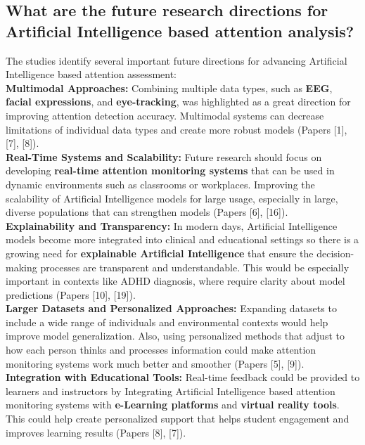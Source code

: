 \documentclass[12pt]{article}
\begin{document}
\subsection{ What are the future research directions for Artificial Intelligence based attention analysis?} 

The studies identify several important future directions for advancing Artificial Intelligence based attention assessment: \\

\textbullet \textbf{Multimodal Approaches:} Combining multiple data types, such as \textbf{EEG}, \textbf{facial expressions}, and \textbf{eye-tracking}, was highlighted as a great direction for improving attention detection accuracy. Multimodal systems can decrease limitations of individual data types and create more robust models (Papers [1], [7], [8]). \\ 

\textbullet \textbf{Real-Time Systems and Scalability:} Future research should focus on developing \textbf{real-time attention monitoring systems} that can be used in dynamic environments such as classrooms or workplaces. Improving the scalability of Artificial Intelligence models for large usage, especially in large, diverse populations that can strengthen models (Papers [6], [16]). \\ 

\textbullet \textbf{Explainability and Transparency:} In modern days, Artificial Intelligence models become more integrated into clinical and educational settings so there is a growing need for \textbf{explainable Artificial Intelligence} that ensure the decision-making processes are transparent and understandable. This would be especially important in contexts like ADHD diagnosis, where require clarity about model predictions (Papers [10], [19]). \\ 

\textbullet \textbf{Larger Datasets and Personalized Approaches:} Expanding datasets to include a wide range of individuals and environmental contexts would help improve model generalization. Also, using personalized methods that adjust to how each person thinks and processes information could make attention monitoring systems work much better and smoother (Papers [5], [9]). \\ 

\textbullet \textbf{Integration with Educational Tools:} Real-time feedback could be provided to learners and instructors by Integrating Artificial Intelligence based attention monitoring systems with \textbf{e-Learning platforms} and \textbf{virtual reality tools}. This could help create personalized support that helps student engagement and improves learning results (Papers [8], [7]). \\ \\
\end{document}
